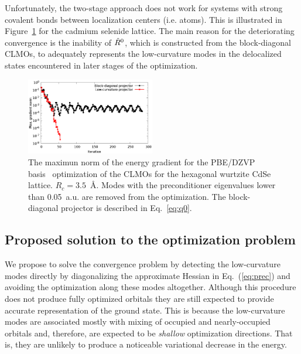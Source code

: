 \documentclass[10pt,amsmath,twocolumn,aps,prl,superscriptaddress,floatfix]{revtex4-1}
\begin{document}
Unfortunately, the two-stage approach does not work for systems with strong covalent bonds between localization centers (i.e. atoms). This is illustrated in Figure~\ref{fig:convergence} for the cadmium selenide lattice. The main reason for the deteriorating convergence is the inability of $\hat{R}^0$, which is constructed from the block-diagonal CLMOs, to adequately represents the low-curvature modes in the delocalized states encountered in later stages of the optimization. 

\begin{figure}
\centering
\includegraphics[width=0.5\textwidth]{convergence}
\caption{The maximun norm of the energy gradient for the PBE/DZVP basis~\cite{vandevondele2007gaussian} optimization of the CLMOs for the hexagonal wurtzite CdSe lattice. $R_c = 3.5$~{\AA}. Modes with the preconditioner eigenvalues lower than 0.05~a.u. are removed from the optimization. The block-diagonal projector is described in Eq.~\ref{eq:q0}.} 
\label{fig:convergence}
\end{figure}


\subsection{Proposed solution to the optimization problem}

We propose to solve the convergence problem by detecting the low-curvature modes directly by diagonalizing the approximate Hessian in Eq.~(\ref{eq:prec}) and avoiding the optimization along these modes altogether. Although this procedure does not produce fully optimized orbitals they are still expected to provide accurate representation of the ground state. This is because the low-curvature modes are associated mostly with mixing of occupied and nearly-occupied orbitals and, therefore, are expected to be \emph{shallow} optimization directions. That is, they are unlikely to produce a noticeable variational decrease in the energy.
\end{document}
